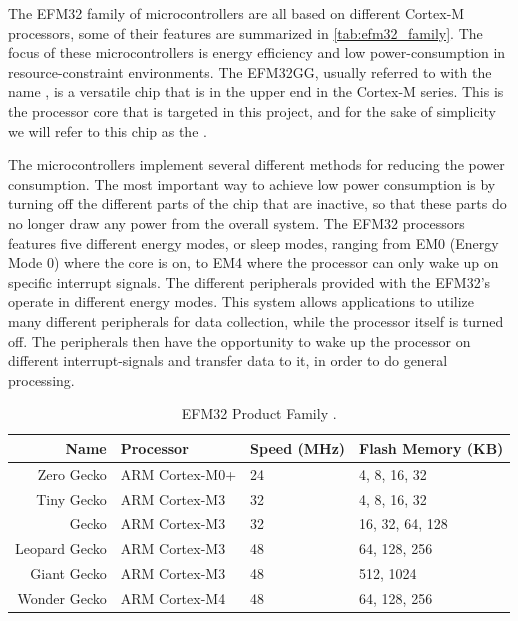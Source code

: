 The EFM32 family of microcontrollers are all based on different Cortex-M processors, some of their features are summarized in \autoref{tab:efm32_family}.
The focus of these microcontrollers is energy efficiency and low power-consumption in resource-constraint environments.
The EFM32GG, usually referred to with the name , is a versatile chip that is in the upper end in the Cortex-M series.
This is the processor core that is targeted in this project, and for the sake of simplicity we will refer to this chip as the {\gecko}.

The microcontrollers implement several different methods for reducing the power consumption.
The most important way to achieve low power consumption is by turning off the different parts of the chip that are inactive, so that these parts do no longer draw any power from the overall system.
The EFM32 processors features five different energy modes, or sleep modes, ranging from EM0 (Energy Mode 0) where the core is on, to EM4 where the processor can only wake up on specific interrupt signals.
The different peripherals provided with the EFM32's operate in different energy modes.
This system allows applications to utilize many different peripherals for data collection, while the processor itself is turned off.
The peripherals then have the opportunity to wake up the processor on different interrupt-signals and transfer data to it, in order to do general processing.

\begin{table}[b]
\begin{center}
    \begin{tabular}{r|l|l|l}
    \textbf{Name} & \textbf{Processor} & \textbf{Speed (MHz)} & \textbf{Flash Memory (KB)} \\
    \hline
    Zero Gecko    & ARM Cortex-M0+ & 24 & 4, 8, 16, 32    \\
    Tiny Gecko    & ARM Cortex-M3  & 32 & 4, 8, 16, 32    \\
    Gecko         & ARM Cortex-M3  & 32 & 16, 32, 64, 128 \\
    Leopard Gecko & ARM Cortex-M3  & 48 & 64, 128, 256    \\
    Giant Gecko   & ARM Cortex-M3  & 48 & 512, 1024       \\
    Wonder Gecko  & ARM Cortex-M4  & 48 & 64, 128, 256    \\
    \hline
    \end{tabular}
\end{center}
\caption{EFM32 Product Family \cite{Labs2014}.}
\label{tab:efm32_family}
\end{table}

